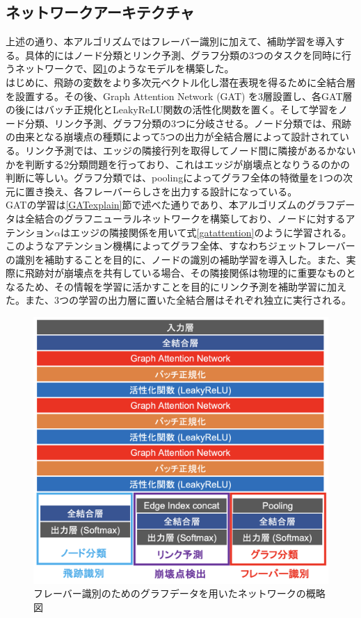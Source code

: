 \subsection{ネットワークアーキテクチャ}
上述の通り、本アルゴリズムではフレーバー識別に加えて、補助学習を導入する。具体的にはノード分類とリンク予測、グラフ分類の3つのタスクを同時に行うネットワークで、図\ref{gnnmodel}のようなモデルを構築した。\\
はじめに、飛跡の変数をより多次元ベクトル化し潜在表現を得るために全結合層を設置する。その後、Graph Attention Network (GAT) を3層設置し、各GAT層の後にはバッチ正規化とLeakyReLU関数の活性化関数を置く。そして学習をノード分類、リンク予測、グラフ分類の3つに分岐させる。ノード分類では、飛跡の由来となる崩壊点の種類によって5つの出力が全結合層によって設計されている。リンク予測では、エッジの隣接行列を取得してノード間に隣接があるかないかを判断する2分類問題を行っており、これはエッジが崩壊点となりうるのかの判断に等しい。グラフ分類では、poolingによってグラフ全体の特徴量を1つの次元に置き換え、各フレーバーらしさを出力する設計になっている。\\
GATの学習は\ref{GATexplain}節で述べた通りであり、本アルゴリズムのグラフデータは全結合のグラフニューラルネットワークを構築しており、ノードに対するアテンション$\alpha$はエッジの隣接関係を用いて式\ref{gatattention}のように学習される。このようなアテンション機構によってグラフ全体、すなわちジェットフレーバーの識別を補助することを目的に、ノードの識別の補助学習を導入した。また、実際に飛跡対が崩壊点を共有している場合、その隣接関係は物理的に重要なものとなるため、その情報を学習に活かすことを目的にリンク予測を補助学習に加えた。また、3つの学習の出力層に置いた全結合層はそれぞれ独立に実行される。\\
\begin{figure}[H]
	\begin{center}
 \includegraphics[keepaspectratio, scale=0.38]
 	{Figure/Flavortagging/gnn.png}
 		\caption{フレーバー識別のためのグラフデータを用いたネットワークの概略図}
 		\label{gnnmodel}
	\end{center}
\end{figure}
